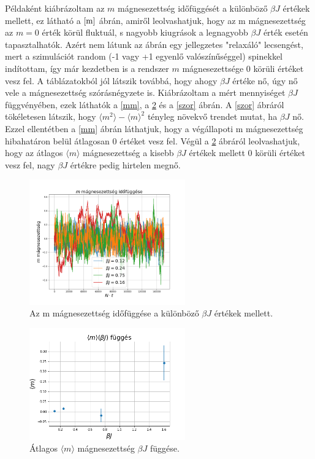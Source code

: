 \documentclass[a4paper, 12pt]{article}
\numberwithin{equation}{section}          %
\numberwithin{figure}{subsection}
\begin{document}
Példaként kiábrázoltam az $m$ mágnesezettség időfüggését a különböző $\beta J$ értékek mellett, ez látható
a $\ref{m}$ ábrán, amiről leolvashatjuk, hogy az m mágnesezettség az $m = 0$ érték körül fluktuál, s nagyobb
kiugrások a legnagyobb $\beta J$ érték esetén tapasztalhatók. Azért nem látunk az ábrán egy jellegzetes "relaxáló" lecsengést, mert a szimulációt random (-1 vagy +1 egyenlő valószínűséggel) spinekkel indítottam,
így már kezdetben is a rendszer $m$ mágnesezettsége $0$ körüli értéket vesz fel. A táblázatokból jól látszik
továbbá, hogy ahogy $\beta J$ értéke nő, úgy nő vele a mágnesezettség szórásnégyzete is. Kiábrázoltam a mért
mennyiséget $\beta J$ függvényében, ezek láthatók a \ref{mm}, a \ref{matlag} és a \ref{szor} ábrán. A \ref{szor} ábráról tökéletesen látszik,
hogy $\langle m^2 \rangle - \langle m\rangle^2$ tényleg növekvő trendet mutat, ha $\beta J$ nő. Ezzel ellentétben a \ref{mm} ábrán láthatjuk,
hogy a végállapoti m mágnesezettség hibahatáron belül átlagosan $0$ értéket vesz fel. Végül a \ref{matlag} ábráról
leolvashatjuk, hogy az átlagos $\langle m \rangle$ mágnesezettség a kisebb $\beta J$ értékek mellett $0$ körüli értéket vesz fel,
nagy $\beta J$ értékre pedig hirtelen megnő.

\begin{figure}[h!]
	\begin{center}
		\includegraphics[width=0.6\textwidth]{m.png}
	\end{center}
\caption{Az m mágnesezettség időfüggése a különböző $\beta J$ értékek mellett.}
\label{m}
\end{figure}

\begin{figure}[h!]
	\begin{center}
		\includegraphics[width=0.6\textwidth]{matlag.png}
	\end{center}
	\caption{Átlagos $\langle m \rangle$ mágnesezettség $\beta J$ függése.}
	\label{matlag}
\end{figure}
\end{document}
